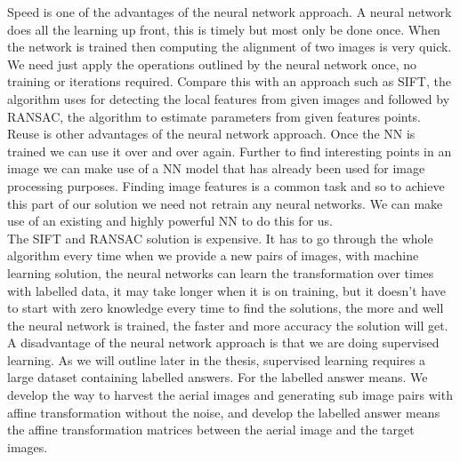 Speed is one of the advantages of the neural network approach. A neural network does all the learning up front, this is timely but most only be done once. When the network is trained then computing the alignment of two images is very quick. We need just apply the operations outlined by the neural network once, no training or iterations required. Compare this with an approach such as SIFT, the algorithm uses for detecting the local features from given images and followed by RANSAC\cite{fischler1981random}, the algorithm to estimate parameters from given features points.\\
Reuse is other advantages of the neural network approach. Once the NN is trained we can use it over and over again. Further to find interesting points in an image we can make use of a NN model that has already been used for image processing purposes. Finding image features is a common task and so to achieve this part of our solution we need not retrain any neural networks. We can make use of an existing and highly powerful NN to do this for us.\\
The SIFT and RANSAC solution is expensive. It has to go through the whole algorithm every time when we provide a new pairs of images, with machine learning solution, the neural networks can learn the transformation over times with labelled data, it may take longer when it is on training, but it doesn't have to start with zero knowledge every time to find the solutions, the more and well the neural network is trained, the faster and more accuracy the solution will get.\\
 A disadvantage of the neural network approach is that we are doing supervised learning. As we will outline later in the thesis, supervised learning requires a large dataset containing labelled answers. For the labelled answer means. We develop the way to harvest the aerial images and generating sub image pairs with affine transformation without the noise, and develop the labelled answer means the affine transformation matrices between the aerial image and the target images. 

